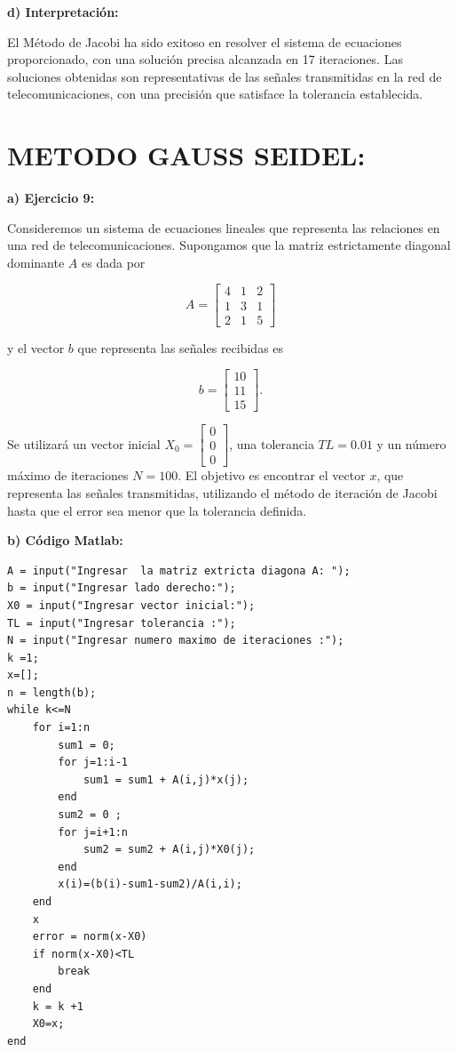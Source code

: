 \documentclass[12pt,a4paper,twoside]{article}  %
\begin{document}
\textbf{d) Interpretación:}

El Método de Jacobi ha sido exitoso en resolver el sistema de ecuaciones proporcionado, con una solución precisa alcanzada en 17 iteraciones. Las soluciones obtenidas son representativas de las señales transmitidas en la red de telecomunicaciones, con una precisión que satisface la tolerancia establecida.




\section{METODO GAUSS SEIDEL:}

\textbf{a) Ejercicio 9: }

Consideremos un sistema de ecuaciones lineales que representa las relaciones en una red de telecomunicaciones. Supongamos que la matriz estrictamente diagonal dominante \( A \) es dada por 

\[
A = \begin{bmatrix}
4 & 1 & 2 \\
1 & 3 & 1 \\
2 & 1 & 5
\end{bmatrix}
\]

y el vector \( b \) que representa las señales recibidas es 

\[
b = \begin{bmatrix}
10 \\
11 \\
15
\end{bmatrix}.
\]

Se utilizará un vector inicial \( X_0 = \begin{bmatrix} 0 \\ 0 \\ 0 \end{bmatrix} \), una tolerancia \( TL = 0.01 \) y un número máximo de iteraciones \( N = 100 \). El objetivo es encontrar el vector \( x \), que representa las señales transmitidas, utilizando el método de iteración de Jacobi hasta que el error sea menor que la tolerancia definida.


\textbf{b) Código Matlab:}

\begin{lstlisting}
A = input("Ingresar  la matriz extricta diagona A: ");
b = input("Ingresar lado derecho:");
X0 = input("Ingresar vector inicial:");
TL = input("Ingresar tolerancia :");
N = input("Ingresar numero maximo de iteraciones :");
k =1;
x=[];
n = length(b);
while k<=N
    for i=1:n
        sum1 = 0;
        for j=1:i-1
            sum1 = sum1 + A(i,j)*x(j);   
        end
        sum2 = 0 ;
        for j=i+1:n
            sum2 = sum2 + A(i,j)*X0(j);
        end
        x(i)=(b(i)-sum1-sum2)/A(i,i);
    end
    x
    error = norm(x-X0)
    if norm(x-X0)<TL
        break
    end
    k = k +1
    X0=x;     
end

\end{lstlisting}
\end{document}
